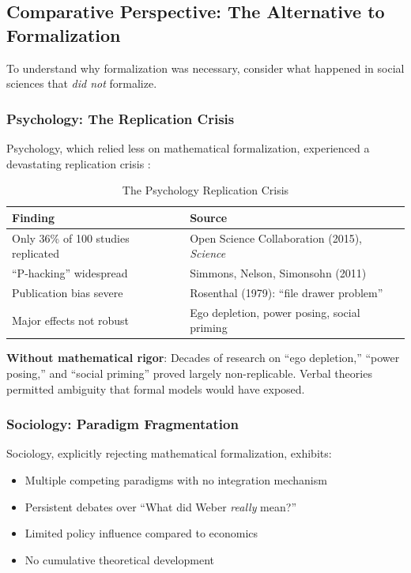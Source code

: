 \subsection{Comparative Perspective: The Alternative to Formalization}
\label{sec:meta-comparative}

To understand why formalization was necessary, consider what happened in
social sciences that \textit{did not} formalize.

\subsubsection{Psychology: The Replication Crisis}

Psychology, which relied less on mathematical formalization, experienced a
devastating replication crisis \citep{osc2015}:

\begin{table}[htbp]
\centering
\caption{The Psychology Replication Crisis}
\label{tab:psych-crisis}
\renewcommand{\arraystretch}{1.3}
\small
\begin{tabular}{@{}lp{8cm}@{}}
\toprule
\textbf{Finding} & \textbf{Source} \\
\midrule
Only 36\% of 100 studies replicated & Open Science Collaboration (2015), \textit{Science} \\
``P-hacking'' widespread & Simmons, Nelson, Simonsohn (2011) \\
Publication bias severe & Rosenthal (1979): ``file drawer problem'' \\
Major effects not robust & Ego depletion, power posing, social priming \\
\bottomrule
\end{tabular}
\end{table}

\textbf{Without mathematical rigor}: Decades of research on ``ego depletion,''
``power posing,'' and ``social priming'' proved largely non-replicable.
Verbal theories permitted ambiguity that formal models would have exposed.

\subsubsection{Sociology: Paradigm Fragmentation}

Sociology, explicitly rejecting mathematical formalization, exhibits:
\begin{itemize}[nosep]
    \item Multiple competing paradigms with no integration mechanism
    \item Persistent debates over ``What did Weber \textit{really} mean?''
    \item Limited policy influence compared to economics
    \item No cumulative theoretical development
\end{itemize}


